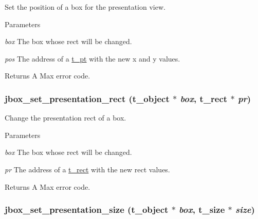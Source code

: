 Set the position of a box for the presentation view. 
\begin{DoxyParams}{Parameters}
\item[{\em box}]The box whose rect will be changed. \item[{\em pos}]The address of a \hyperlink{structt__pt}{t\_\-pt} with the new x and y values. \end{DoxyParams}
\begin{DoxyReturn}{Returns}
A Max error code. 
\end{DoxyReturn}
\hypertarget{group__jbox_gad7d842670d42f7959b9a388eaf716d46}{
\subsubsection[{jbox\_\-set\_\-presentation\_\-rect}]{ jbox\_\-set\_\-presentation\_\-rect ({\bf t\_\-object} $\ast$ {\em box}, \/  {\bf t\_\-rect} $\ast$ {\em pr})}}
\label{group__jbox_gad7d842670d42f7959b9a388eaf716d46}


Change the presentation rect of a box. 
\begin{DoxyParams}{Parameters}
\item[{\em box}]The box whose rect will be changed. \item[{\em pr}]The address of a \hyperlink{structt__rect}{t\_\-rect} with the new rect values. \end{DoxyParams}
\begin{DoxyReturn}{Returns}
A Max error code. 
\end{DoxyReturn}
\hypertarget{group__jbox_ga6765c83aed47db064a1cf0581474f5c0}{
\subsubsection[{jbox\_\-set\_\-presentation\_\-size}]{ jbox\_\-set\_\-presentation\_\-size ({\bf t\_\-object} $\ast$ {\em box}, \/  {\bf t\_\-size} $\ast$ {\em size})}}
\label{group__jbox_ga6765c83aed47db064a1cf0581474f5c0}


